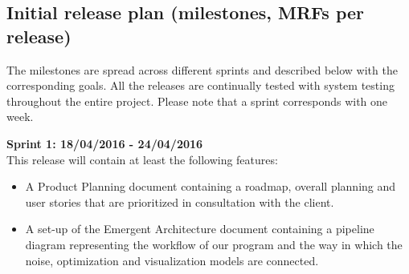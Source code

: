 
\newpage 

\subsection{Initial release plan (milestones, MRFs per release)}
The milestones are spread across different sprints and described below with the corresponding goals. All the releases are continually tested with system testing throughout the entire project. Please note that a sprint corresponds with one week.

\textbf{Sprint 1: 18/04/2016 - 24/04/2016 } \\
This release will contain at least the following features:
\begin{itemize}
\item A Product Planning document containing a roadmap, overall planning and user stories that are prioritized in consultation with the client.
\item A set-up of the Emergent Architecture document containing a pipeline diagram representing the workflow of our program and the way in which the noise, optimization and visualization models are connected.
\end{itemize}

